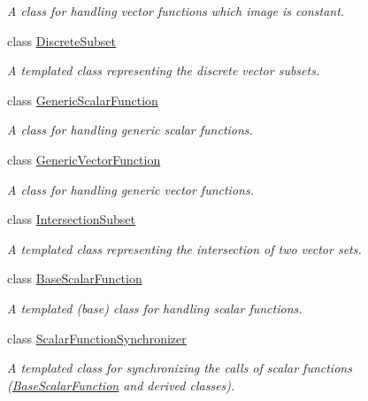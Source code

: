 \begin{DoxyCompactItemize}
\begin{DoxyCompactList}\small\item\em A class for handling vector functions which image is constant. \end{DoxyCompactList}\item 
class \hyperlink{class_q_u_e_s_o_1_1_discrete_subset}{Discrete\-Subset}
\begin{DoxyCompactList}\small\item\em A templated class representing the discrete vector subsets. \end{DoxyCompactList}\item 
class \hyperlink{class_q_u_e_s_o_1_1_generic_scalar_function}{Generic\-Scalar\-Function}
\begin{DoxyCompactList}\small\item\em A class for handling generic scalar functions. \end{DoxyCompactList}\item 
class \hyperlink{class_q_u_e_s_o_1_1_generic_vector_function}{Generic\-Vector\-Function}
\begin{DoxyCompactList}\small\item\em A class for handling generic vector functions. \end{DoxyCompactList}\item 
class \hyperlink{class_q_u_e_s_o_1_1_intersection_subset}{Intersection\-Subset}
\begin{DoxyCompactList}\small\item\em A templated class representing the intersection of two vector sets. \end{DoxyCompactList}\item 
class \hyperlink{class_q_u_e_s_o_1_1_base_scalar_function}{Base\-Scalar\-Function}
\begin{DoxyCompactList}\small\item\em A templated (base) class for handling scalar functions. \end{DoxyCompactList}\item 
class \hyperlink{class_q_u_e_s_o_1_1_scalar_function_synchronizer}{Scalar\-Function\-Synchronizer}
\begin{DoxyCompactList}\small\item\em A templated class for synchronizing the calls of scalar functions (\hyperlink{class_q_u_e_s_o_1_1_base_scalar_function}{Base\-Scalar\-Function} and derived classes). \end{DoxyCompactList}\item 

\end{DoxyCompactItemize}
